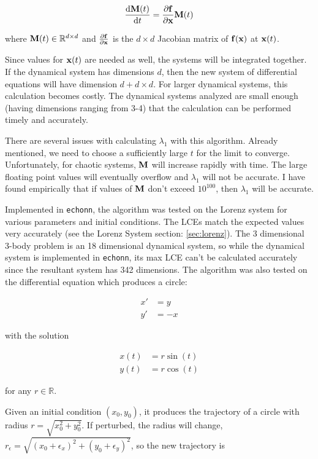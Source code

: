 \documentclass{article}
\newcommand{\echonn}{\texttt{echonn}}
\newcommand{\der}[2][t]{\frac{\mathrm{d}#2}{\mathrm{d}#1}}
\begin{document}
\begin{equation}
    \der{\Mv(t)} = \frac{\partial \fv}{\partial \xv} \Mv(t)
    \label{eq:lce_mat_diffeq}
\end{equation}

where $\mathbf{M}(t) \in \mathbb{R}^{d \times d}$ and $\frac{\partial \mathbf{f}}{\partial \mathbf{x}}$
is the $d \times d$ Jacobian matrix of $\mathbf{f}(\mathbf{x})$ at $\mathbf{x}(t)$.

Since values for $\mathbf{x}(t)$ are needed as well, the systems will be integrated 
together. If the dynamical system has dimensions $d$, then the new system of
differential equations will have dimension $d + d \times d$. For larger dynamical 
systems, this calculation becomes costly. The dynamical systems analyzed are
small enough (having dimensions ranging from 3-4) that the calculation can be 
performed timely and accurately.

There are several issues with calculating $\lambda_1$ with this algorithm.
Already mentioned, we need to choose a sufficiently
large $t$ for the limit to converge. 
Unfortunately, for chaotic systems, $\mathbf{M}$ will increase rapidly with time. The 
large floating point values will eventually overflow and $\lambda_1$ will not
be accurate. I have found empirically that if values of $\mathbf{M}$ don't exceed 
$10^{100}$, then $\lambda_1$ will be accurate.

Implemented in \echonn, the algorithm was tested on the Lorenz system for various 
parameters and initial conditions. The LCEs match the expected values very 
accurately (see the Lorenz System section: \ref{sec:lorenz}).
The 3 dimensional 3-body problem is an 18 dimensional dynamical system, so while 
the dynamical system is implemented in \echonn, its max LCE can't be calculated 
accurately since the resultant system has 342 dimensions. The algorithm was 
also tested on the differential equation which produces a circle:

\begin{align*}
    x' &= y \\
    y' &= -x
\end{align*}

with the solution 

\begin{align*}
    x(t) &= r\sin(t) \\
    y(t) &= r\cos(t)
\end{align*}

for any $r \in \mathbb{R}$.

Given an initial condition $(x_0, y_0)$, it produces the trajectory of a circle
with radius $r=\sqrt{x_0^2 + y_0^2}$. If perturbed, the radius will change, 
$r_\epsilon=\sqrt{(x_0+\epsilon_x)^2 + (y_0+\epsilon_y)^2}$, so the new 
trajectory is 
\end{document}
